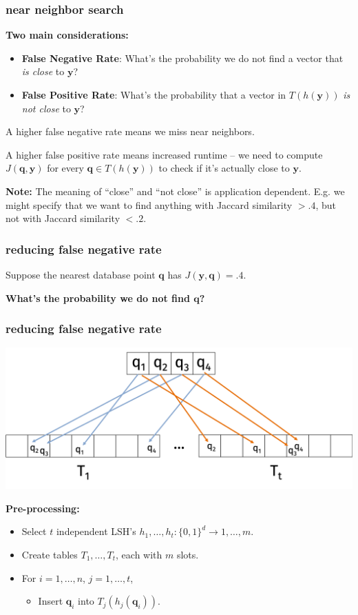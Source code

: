 \documentclass[compress]{beamer}
\newcommand{\bv}[1]{\mathbf{#1}}
\begin{document}
\begin{frame}
	\frametitle{near neighbor search}
	\textbf{Two main considerations:}
	\begin{itemize}
		\item \textbf{False Negative Rate}: What's the probability we do not find a vector that \emph{is close} to $\bv{y}$?
		\item \textbf{False Positive Rate}: What's the probability that a vector in $T(h(\bv{y}))$ \emph{is not close} to $\bv{y}$?
	\end{itemize}

A higher false negative rate means we miss near neighbors.

A higher false positive rate means increased runtime -- we need to compute $J(\bv{q},\bv{y})$ for every $\bv{q}\in T(h(\bv{y}))$ to check if it's actually close to $\bv{y}$.

\textbf{Note:} The meaning of ``close'' and ``not close'' is application dependent. E.g. we might specify that we want to find anything with Jaccard similarity $> .4$, but not with Jaccard similarity $< .2$. 
\end{frame}

\begin{frame}
	\frametitle{reducing false negative rate}	
	Suppose the nearest database point $\bv{q}$ has $J(\bv{y},\bv{q}) = .4$.
	\begin{center}
	\textbf{\alert{What's the probability we do not find $\bv{q}$?}}
	\end{center}
\end{frame}

\begin{frame}
	\frametitle{reducing false negative rate}
	\begin{center}
		\includegraphics[width=.8\textwidth]{many_tables.png}
	\end{center}
	\textbf{Pre-processing:}
	\begin{itemize}
		\item Select $t$ independent LSH's $h_1, \ldots, h_t: \{0,1\}^d \rightarrow 1,\ldots, m$.
		\item Create tables $T_1, \ldots, T_t$, each with $m$ slots. 
		\item For $i = 1,\ldots, n$, $j = 1,\ldots, t$, 
		\begin{itemize}
			\item Insert $\bv{q}_i$ into $T_j(h_j(\bv{q}_i))$.
		\end{itemize}
	\end{itemize}
\end{frame}
\end{document}

